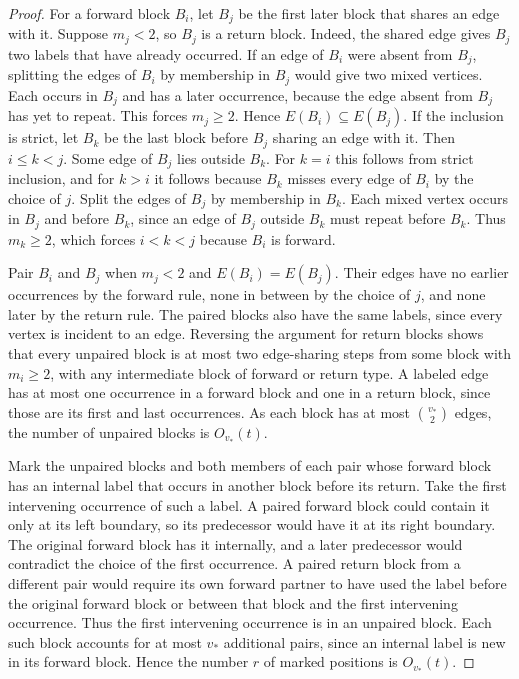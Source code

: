 \documentclass[11pt,letterpaper]{article}
\begin{document}
\begin{proof}
For a forward block \(B_i\), let \(B_j\) be the first later block that
shares an edge with it. Suppose \(m_j<2\), so \(B_j\) is a return block.
Indeed, the shared edge gives \(B_j\) two labels that have already occurred.
If an edge of \(B_i\) were absent from \(B_j\), splitting the edges of
\(B_i\) by membership in \(B_j\) would give two mixed vertices. Each occurs
in \(B_j\) and has a later occurrence, because the edge absent from
\(B_j\) has yet to repeat. This forces \(m_j\ge2\). Hence
\(E(B_i)\subseteq E(B_j)\). If the inclusion is strict, let \(B_k\) be the
last block before \(B_j\) sharing an edge with it. Then \(i\le k<j\).
Some edge of \(B_j\) lies outside \(B_k\). For \(k=i\) this follows from
strict inclusion, and for \(k>i\) it follows because \(B_k\) misses every
edge of \(B_i\) by the choice of \(j\). Split the edges of \(B_j\) by
membership in \(B_k\). Each mixed vertex occurs in \(B_j\) and before
\(B_k\), since an edge of \(B_j\) outside \(B_k\) must repeat before
\(B_k\). Thus \(m_k\ge2\), which forces \(i<k<j\) because \(B_i\) is forward.

Pair \(B_i\) and \(B_j\) when \(m_j<2\) and \(E(B_i)=E(B_j)\). Their edges
have no earlier occurrences by the forward rule, none in between by
the choice of \(j\), and none later by the return rule.
The paired blocks also have the same labels, since every vertex is
incident to an edge.
Reversing the argument for return blocks shows that
every unpaired block is at most two edge-sharing steps from some
block with \(m_i\ge2\), with any intermediate block of forward or
return type. A labeled edge has at most one occurrence in a forward
block and one in a return block, since those are its first and last
occurrences. As each block has at most \(\binom{v_\ast}{2}\) edges, the
number of unpaired blocks is \(O_{v_\ast}(t)\).

Mark the unpaired blocks and both members of each pair whose forward
block has an internal label that occurs in another block before its
return. Take the first intervening occurrence of such a label. A
paired forward block could contain it only at its left boundary, so
its predecessor would have it at its right boundary. The original
forward block has it internally, and a later predecessor would
contradict the choice of the first occurrence. A paired return block
from a different pair would require its own forward partner to have
used the label before the original forward block or between that
block and the first intervening occurrence. Thus the first
intervening occurrence is in an unpaired block.
Each such block accounts for at most \(v_\ast\)
additional pairs, since an internal label is new in its forward
block. Hence the number \(r\) of marked positions is \(O_{v_\ast}(t)\).


\end{proof}
\end{document}

